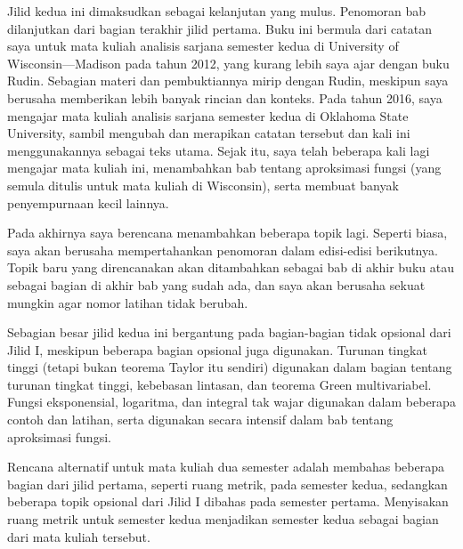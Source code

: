 
Jilid kedua  ini dimaksudkan sebagai kelanjutan yang
mulus. Penomoran bab dilanjutkan dari bagian terakhir jilid pertama. Buku ini
bermula dari catatan saya untuk mata kuliah analisis sarjana semester kedua di
University of Wisconsin---Madison pada tahun 2012, yang kurang lebih saya ajar
dengan buku Rudin. Sebagian materi dan pembuktiannya mirip dengan Rudin,
meskipun saya berusaha memberikan lebih banyak rincian dan konteks.
Pada tahun 2016, saya mengajar mata kuliah analisis sarjana semester kedua di
Oklahoma State University, sambil mengubah dan merapikan catatan tersebut dan
kali ini menggunakannya sebagai teks utama. Sejak itu, saya telah beberapa kali
lagi mengajar mata kuliah ini, menambahkan bab tentang aproksimasi fungsi (yang semula
ditulis untuk mata kuliah di Wisconsin), serta membuat banyak penyempurnaan
kecil lainnya.

Pada akhirnya saya berencana menambahkan beberapa topik lagi.
Seperti biasa, saya akan berusaha mempertahankan penomoran dalam edisi-edisi
berikutnya. Topik baru yang direncanakan akan ditambahkan sebagai bab di akhir
buku atau sebagai bagian di akhir bab yang sudah ada, dan saya akan berusaha
sekuat mungkin agar nomor latihan tidak berubah.

Sebagian besar jilid kedua ini bergantung pada bagian-bagian tidak opsional dari
Jilid I\@, meskipun beberapa bagian opsional juga digunakan.
Turunan tingkat tinggi (tetapi bukan teorema Taylor itu sendiri) digunakan
dalam bagian tentang turunan tingkat tinggi, kebebasan lintasan, dan teorema
Green multivariabel. Fungsi eksponensial, logaritma, dan integral tak wajar
digunakan dalam beberapa contoh dan latihan, serta digunakan secara intensif
dalam bab tentang aproksimasi fungsi.

Rencana alternatif untuk mata kuliah dua semester adalah membahas beberapa
bagian dari jilid pertama, seperti ruang metrik, pada semester kedua, sedangkan
beberapa topik opsional dari Jilid I dibahas pada semester pertama. Menyisakan
ruang metrik untuk semester kedua menjadikan semester kedua sebagai bagian
 dari mata kuliah tersebut.

